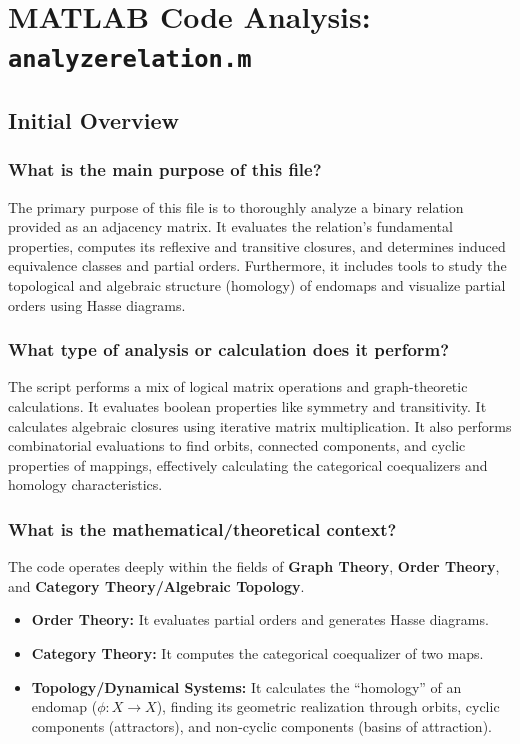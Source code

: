 \chapter{MATLAB Code Analysis: \texttt{analyzerelation.m}}
\author{}
\date{}


\maketitle

\section{Initial Overview}

\subsection*{What is the main purpose of this file?}
The primary purpose of this file is to thoroughly analyze a binary relation provided as an adjacency matrix. It evaluates the relation's fundamental properties, computes its reflexive and transitive closures, and determines induced equivalence classes and partial orders. Furthermore, it includes tools to study the topological and algebraic structure (homology) of endomaps and visualize partial orders using Hasse diagrams.

\subsection*{What type of analysis or calculation does it perform?}
The script performs a mix of logical matrix operations and graph-theoretic calculations. It evaluates boolean properties like symmetry and transitivity. It calculates algebraic closures using iterative matrix multiplication. It also performs combinatorial evaluations to find orbits, connected components, and cyclic properties of mappings, effectively calculating the categorical coequalizers and homology characteristics.

\subsection*{What is the mathematical/theoretical context?}
The code operates deeply within the fields of \textbf{Graph Theory}, \textbf{Order Theory}, and \textbf{Category Theory/Algebraic Topology}. 
\begin{itemize}
    \item \textbf{Order Theory:} It evaluates partial orders and generates Hasse diagrams. 
    \item \textbf{Category Theory:} It computes the categorical coequalizer of two maps.
    \item \textbf{Topology/Dynamical Systems:} It calculates the ``homology'' of an endomap ($\phi: X \to X$), finding its geometric realization through orbits, cyclic components (attractors), and non-cyclic components (basins of attraction).
\end{itemize}


